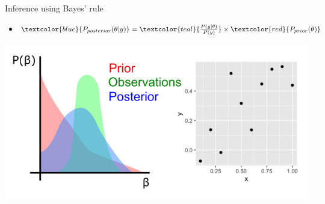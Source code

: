\documentclass[10pt]{beamer}
\begin{document}
\begin{frame}{Inference using Bayes' rule}
  \begin{itemize}
  \item $\textcolor{blue}{P_{posterior}(\theta|y)} = \textcolor{teal}{\frac{P(y|\theta)}{P(y)}} \times \textcolor{red}{P_{prior}(\theta)} $
      \end{itemize}
\includegraphics[width=\textwidth]{bayes-inf-4.png}
\end{frame}
\end{document}
